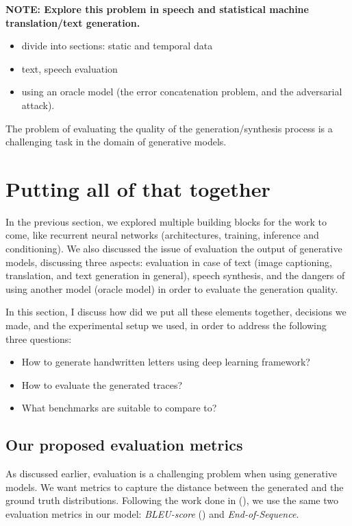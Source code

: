 \textbf{NOTE: Explore this problem in speech and statistical machine translation/text generation.}
\begin{itemize}[noitemsep]
    \item divide into sections: static and temporal data
    \item text, speech evaluation
    \item using an oracle model (the error concatenation problem, and the adversarial attack).
\end{itemize}
\par The problem of evaluating the quality of the generation/synthesis process is a challenging task in the domain of generative models.

\section{Putting all of that together}
\par In the previous section, we explored multiple building blocks for the work to come, like recurrent neural networks (architectures, training, inference and conditioning). We also discussed the issue of evaluation the output of generative models, discussing three aspects: evaluation in case of text (image captioning, translation, and text generation in general), speech synthesis, and the dangers of using another model (oracle model) in order to evaluate the generation quality.

\par In this section, I discuss how did we put all these elements together, decisions we made, and the experimental setup we used, in order to address the following three questions:
\begin{itemize}[noitemsep]
    \item How to generate handwritten letters using deep learning framework?
    \item How to evaluate the generated traces?
    \item What benchmarks are suitable to compare to?
\end{itemize}

\subsection{Our proposed evaluation metrics}\label{subsec:eval_metrics}
\par As discussed earlier, evaluation is a challenging problem when using generative models. We want metrics to capture the distance between the generated and the ground truth distributions. Following the work done in (\citep{mohammed2018handwriting}), we use the same two evaluation metrics in our model: \textit{BLEU-score} (\citep{papineni2002bleu}) and \textit{End-of-Sequence}.

